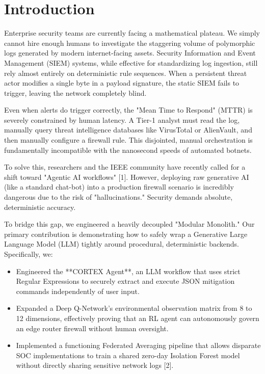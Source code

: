 \documentclass[conference]{IEEEtran}
\begin{document}
\section{Introduction}
Enterprise security teams are currently facing a mathematical plateau. We simply cannot hire enough humans to investigate the staggering volume of polymorphic logs generated by modern internet-facing assets. Security Information and Event Management (SIEM) systems, while effective for standardizing log ingestion, still rely almost entirely on deterministic rule sequences. When a persistent threat actor modifies a single byte in a payload signature, the static SIEM fails to trigger, leaving the network completely blind.

Even when alerts do trigger correctly, the "Mean Time to Respond" (MTTR) is severely constrained by human latency. A Tier-1 analyst must read the log, manually query threat intelligence databases like VirusTotal or AlienVault, and then manually configure a firewall rule. This disjointed, manual orchestration is fundamentally incompatible with the nanosecond speeds of automated botnets.

To solve this, researchers and the IEEE community have recently called for a shift toward "Agentic AI workflows" [1]. However, deploying raw generative AI (like a standard chat-bot) into a production firewall scenario is incredibly dangerous due to the risk of "hallucinations." Security demands absolute, deterministic accuracy. 

To bridge this gap, we engineered a heavily decoupled "Modular Monolith." Our primary contribution is demonstrating how to safely wrap a Generative Large Language Model (LLM) tightly around procedural, deterministic backends. Specifically, we:
\begin{itemize}
    \item Engineered the **CORTEX Agent**, an LLM workflow that uses strict Regular Expressions to securely extract and execute JSON mitigation commands independently of user input.
    \item Expanded a Deep Q-Network's environmental observation matrix from 8 to 12 dimensions, effectively proving that an RL agent can autonomously govern an edge router firewall without human oversight.
    \item Implemented a functioning Federated Averaging pipeline that allows disparate SOC implementations to train a shared zero-day Isolation Forest model without directly sharing sensitive network logs [2].
\end{itemize}
\end{document}
